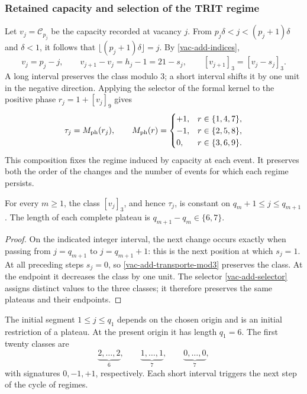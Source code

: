 \subsubsection{Retained capacity and selection of the TRIT regime}
\label{vac-add-regimen}

Let \(v_j=\mathcal C_{p_j}\) be the capacity recorded at vacancy \(j\). From \(p_j\delta<j<(p_j+1)\delta\) and \(\delta<1\), it follows that \(\lfloor(p_j+1)\delta\rfloor=j\). By \eqref{vac-add-indices},
\begin{equation}
 v_j=p_j-j,
 \qquad v_{j+1}-v_j=h_j-1=21-s_j,
 \qquad [v_{j+1}]_3=[v_j-s_j]_3.
 \label{vac-add-transporte-mod3}
\end{equation}
A long interval preserves the class modulo \(3\); a short interval shifts it by one unit in the negative direction. Applying the selector of the formal kernel to the positive phase \(r_j=1+[v_j]_9\) gives
\begin{equation}
 \tau_j=M_{\rm ph}(r_j),\qquad
 M_{\rm ph}(r)=
 \begin{cases}
 +1,&r\in\{1,4,7\},\\
 -1,&r\in\{2,5,8\},\\
 0,&r\in\{3,6,9\}.
 \end{cases}
 \label{vac-add-selector}
\end{equation}
This composition fixes the regime induced by capacity at each event. It preserves both the order of the changes and the number of events for which each regime persists.

\begin{corollary}
\label{vac-add-mesetas}
For every \(m\geq1\), the class \([v_j]_3\), and hence \(\tau_j\), is constant on \(q_m+1\leq j\leq q_{m+1}\). The length of each complete plateau is \(q_{m+1}-q_m\in\{6,7\}\).
\end{corollary}
\begin{proof}
On the indicated integer interval, the next change occurs exactly when passing from \(j=q_{m+1}\) to \(j=q_{m+1}+1\): this is the next position at which \(s_j=1\). At all preceding steps \(s_j=0\), so \eqref{vac-add-transporte-mod3} preserves the class. At the endpoint it decreases the class by one unit. The selector \eqref{vac-add-selector} assigns distinct values to the three classes; it therefore preserves the same plateaus and their endpoints.
\end{proof}

The initial segment \(1\leq j\leq q_1\) depends on the chosen origin and is an initial restriction of a plateau. At the present origin it has length \(q_1=6\). The first twenty classes are
\[
 \underbrace{2,\ldots,2}_{6},\qquad
 \underbrace{1,\ldots,1}_{7},\qquad
 \underbrace{0,\ldots,0}_{7},
\]
with signatures \(0,-1,+1\), respectively. Each short interval triggers the next step of the cycle of regimes.

